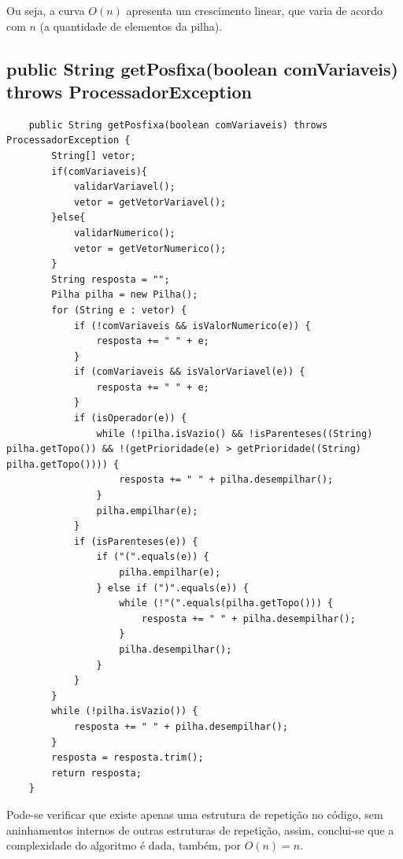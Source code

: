 \documentclass[a4paper,11pt]{article}
\begin{document}
Ou seja, a curva $O(n)$ apresenta um crescimento linear, que varia de acordo com $n$ (a quantidade de elementos da pilha).

\subsection{public String getPosfixa(boolean comVariaveis) throws ProcessadorException}
\begin{lstlisting}
    public String getPosfixa(boolean comVariaveis) throws ProcessadorException {        
        String[] vetor;       
        if(comVariaveis){
            validarVariavel();
            vetor = getVetorVariavel();
        }else{
            validarNumerico();
            vetor = getVetorNumerico();
        }       
        String resposta = "";
        Pilha pilha = new Pilha();       
        for (String e : vetor) {
            if (!comVariaveis && isValorNumerico(e)) {
                resposta += " " + e;
            }          
            if (comVariaveis && isValorVariavel(e)) {
                resposta += " " + e;
            }
            if (isOperador(e)) {
                while (!pilha.isVazio() && !isParenteses((String) pilha.getTopo()) && !(getPrioridade(e) > getPrioridade((String) pilha.getTopo()))) {
                    resposta += " " + pilha.desempilhar();
                }
                pilha.empilhar(e);
            }
            if (isParenteses(e)) {
                if ("(".equals(e)) {
                    pilha.empilhar(e);
                } else if (")".equals(e)) {
                    while (!"(".equals(pilha.getTopo())) {
                        resposta += " " + pilha.desempilhar();
                    }
                    pilha.desempilhar();
                }
            }
        }
        while (!pilha.isVazio()) {
            resposta += " " + pilha.desempilhar();
        }      
        resposta = resposta.trim();
        return resposta;
    }
\end{lstlisting}
Pode-se verificar que existe apenas uma estrutura de repetição no código, sem aninhamentos internos de outras estruturas de repetição, assim, conclui-se que a complexidade do algoritmo é dada, também, por \(O(n)=n\).
\end{document}
